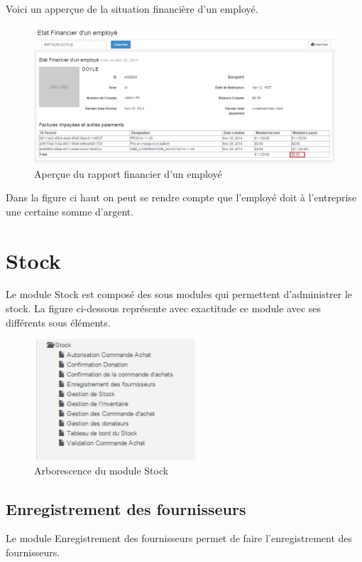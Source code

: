 \documentclass[12pt,a4paper]{report}
\begin{document}
Voici un apperçue de la situation financière d'un employé.

\begin{figure}[h]
\begin{center}
\includegraphics[width=14cm]{pic/EtatFinEmpl.png}
\end{center}
\caption{Aperçue du rapport financier d'un employé}
\label{Aperçue du rapport financier d'un employé}
\end{figure}

Dans la figure ci haut on peut se rendre compte que l'employé doit à l'entreprise une certaine somme d'argent.

\newpage
\chapter{Stock}        
Le module Stock est composé des sous modules qui permettent d'administrer le stock. La figure ci-dessous représente avec exactitude ce module avec ses différents sous éléments.

\begin{figure}[h]
\begin{center}
\includegraphics[width=6cm]{pic/StockManagement.png}
\end{center}
\caption{Arborescence du module Stock}
\label{Arborescence du module Stock}
\end{figure}


\section{Enregistrement des fournisseurs}
Le module Enregistrement des fournisseurs permet de faire l'enregistrement des fournisseurs.
\end{document}
